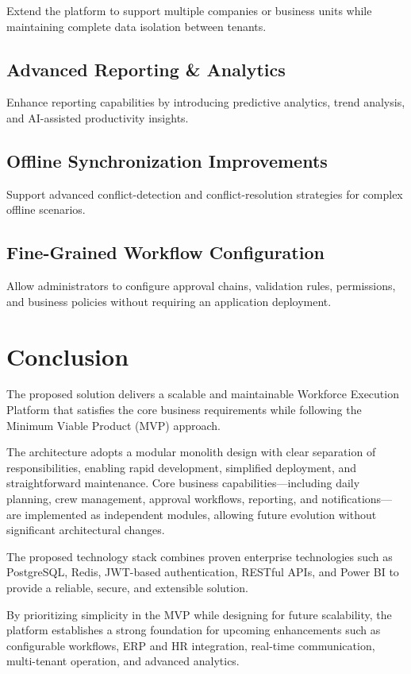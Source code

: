 \documentclass[11pt]{article}
\begin{document}
Extend the platform to support multiple companies or business units while
maintaining complete data isolation between tenants.

\subsection{Advanced Reporting \& Analytics}

Enhance reporting capabilities by introducing predictive analytics, trend
analysis, and AI-assisted productivity insights.

\subsection{Offline Synchronization Improvements}

Support advanced conflict-detection and conflict-resolution strategies for
complex offline scenarios.

\subsection{Fine-Grained Workflow Configuration}

Allow administrators to configure approval chains, validation rules,
permissions, and business policies without requiring an application
deployment.

\clearpage
\section{Conclusion}

The proposed solution delivers a scalable and maintainable Workforce Execution
Platform that satisfies the core business requirements while following the
Minimum Viable Product (MVP) approach.

The architecture adopts a modular monolith design with clear separation of
responsibilities, enabling rapid development, simplified deployment, and
straightforward maintenance. Core business capabilities---including daily
planning, crew management, approval workflows, reporting, and
notifications---are implemented as independent modules, allowing future
evolution without significant architectural changes.

The proposed technology stack combines proven enterprise technologies such as
PostgreSQL, Redis, JWT-based authentication, RESTful APIs, and Power BI to
provide a reliable, secure, and extensible solution.

By prioritizing simplicity in the MVP while designing for future scalability,
the platform establishes a strong foundation for upcoming enhancements such as
configurable workflows, ERP and HR integration, real-time communication,
multi-tenant operation, and advanced analytics.
\end{document}
